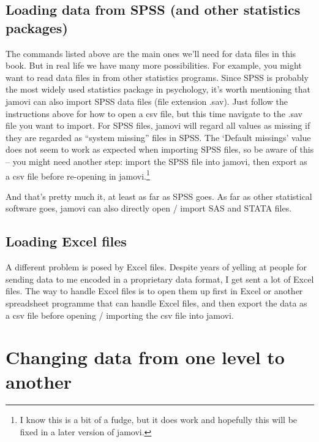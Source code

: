 \documentclass[
  a4paper,
]{book}
\begin{document}
\hypertarget{loading-data-from-spss-and-other-statistics-packages}{%
\subsection{Loading data from SPSS (and other statistics
packages)}\label{loading-data-from-spss-and-other-statistics-packages}}

The commands listed above are the main ones we'll need for data files in
this book. But in real life we have many more possibilities. For
example, you might want to read data files in from other statistics
programs. Since SPSS is probably the most widely used statistics package
in psychology, it's worth mentioning that jamovi can also import SPSS
data files (file extension .sav). Just follow the instructions above for
how to open a csv file, but this time navigate to the .sav file you want
to import. For SPSS files, jamovi will regard all values as missing if
they are regarded as ``system missing'' files in SPSS. The `Default
missings' value does not seem to work as expected when importing SPSS
files, so be aware of this -- you might need another step: import the
SPSS file into jamovi, then export as a csv file before re-opening in
jamovi.\footnote{I know this is a bit of a fudge, but it does work and
  hopefully this will be fixed in a later version of jamovi.}

And that's pretty much it, at least as far as SPSS goes. As far as other
statistical software goes, jamovi can also directly open / import SAS
and STATA files.

\hypertarget{loading-excel-files}{%
\subsection{Loading Excel files}\label{loading-excel-files}}

A different problem is posed by Excel files. Despite years of yelling at
people for sending data to me encoded in a proprietary data format, I
get sent a lot of Excel files. The way to handle Excel files is to open
them up first in Excel or another spreadsheet programme that can handle
Excel files, and then export the data as a csv file before opening /
importing the csv file into jamovi.

\hypertarget{sec-Changing-data-from-one-level-to-another}{%
\section{Changing data from one level to
another}\label{sec-Changing-data-from-one-level-to-another}}
\end{document}
